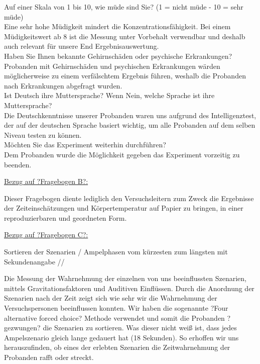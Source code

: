 \documentclass{Bericht}
\begin{document}
Auf einer Skala von 1 bis 10, wie müde sind Sie? (1 = nicht müde - 10 = sehr müde) \\

Eine sehr hohe Müdigkeit mindert die Konzentrationsfähigkeit. Bei einem Müdigkeitswert ab 8 ist die Messung unter Vorbehalt verwendbar und deshalb auch relevant für unsere End Ergebnisauswertung. \\

Haben Sie Ihnen bekannte Gehirnschäden oder psychische Erkrankungen?\\

Probanden mit Gehirnschäden und psychischen Erkrankungen wärden möglicherweise zu einem verfälschtem Ergebnis führen, weshalb die Probanden nach Erkrankungen abgefragt wurden. \\

Ist Deutsch ihre Muttersprache? Wenn Nein, welche Sprache ist ihre Muttersprache? \\

Die Deutschkenntnisse unserer Probanden waren uns aufgrund des Intelligenztest, der auf der deutschen Sprache basiert wichtig, um alle Probanden auf dem selben Niveau testen zu können.  \\

Möchten Sie das Experiment weiterhin durchführen? \\

Dem Probanden wurde die Möglichkeit gegeben das Experiment vorzeitig zu beenden. 

\par

\underline{Bezug auf ?Fragebogen B?:} 

Dieser Fragebogen diente lediglich den Versuchsleitern zum Zweck die Ergebnisse der Zeiteinschätzungen und Körpertemperatur auf Papier zu bringen, in einer reproduzierbaren und geordneten Form.

\par

\underline{Bezug auf ?Fragebogen C?:}

Sortieren der Szenarien / Ampelphasen vom kürzesten zum längsten mit Sekundenangabe //

Die Messung der Wahrnehmung der einzelnen von uns beeinflussten Szenarien, mittels Gravitationsfaktoren und Auditiven Einflüssen. Durch die Anordnung der Szenarien nach der Zeit zeigt sich wie sehr wir die Wahrnehmung der Versuchspersonen beeinflussen konnten.  Wir haben die sogenannte ?Four alternative forced choice? Methode verwendet und somit die Probanden ?gezwungen? die Szenarien zu sortieren. Was dieser nicht weiß ist, dass jedes Ampelszenario gleich lange gedauert hat (18 Sekunden). So erhoffen wir uns herauszufinden, ob eines der erlebten Szenarien die Zeitwahrnehmung der Probanden rafft oder streckt. \\
\end{document}
